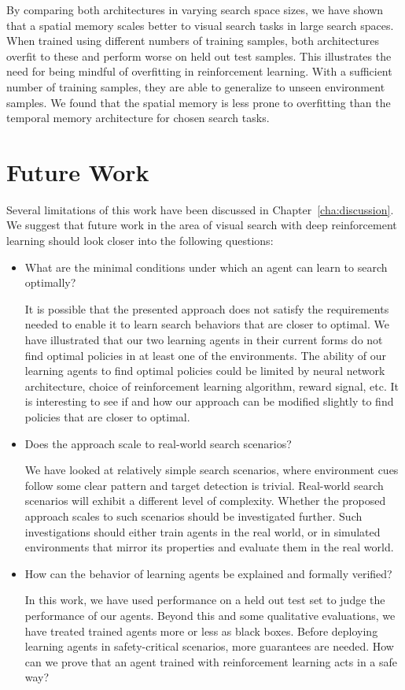 By comparing both architectures in varying search space sizes, we have shown that a spatial memory scales better to visual search tasks in large search spaces.
When trained using different numbers of training samples, both architectures overfit to these and perform worse on held out test samples.
This illustrates the need for being mindful of overfitting in reinforcement learning.
With a sufficient number of training samples, they are able to generalize to unseen environment samples.
We found that the spatial memory is less prone to overfitting than the temporal memory architecture for chosen search tasks.

\section{Future Work}

Several limitations of this work have been discussed in Chapter~\ref{cha:discussion}.
We suggest that future work in the area of visual search with deep reinforcement learning should look closer into the following questions:

\begin{itemize}
    \item What are the minimal conditions under which an agent can learn to search optimally?
    
    It is possible that the presented approach does not satisfy the requirements needed to enable it to learn search behaviors that are closer to optimal.
    We have illustrated that our two learning agents in their current forms do not find optimal policies in at least one of the environments.
    The ability of our learning agents to find optimal policies could be limited by neural network architecture, choice of reinforcement learning algorithm, reward signal, etc.
    It is interesting to see if and how our approach can be modified slightly to find policies that are closer to optimal.

    \item Does the approach scale to real-world search scenarios?

    We have looked at relatively simple search scenarios, where environment cues follow some clear pattern and target detection is trivial.
    Real-world search scenarios will exhibit a different level of complexity.
    Whether the proposed approach scales to such scenarios should be investigated further.
    Such investigations should either train agents in the real world, or in simulated environments that mirror its properties and evaluate them in the real world.

    \item How can the behavior of learning agents be explained and formally verified?
    
    In this work, we have used performance on a held out test set to judge the performance of our agents.
    Beyond this and some qualitative evaluations, we have treated trained agents more or less as black boxes. 
    Before deploying learning agents in safety-critical scenarios, more guarantees are needed.
    How can we prove that an agent trained with reinforcement learning acts in a safe way?
\end{itemize}

